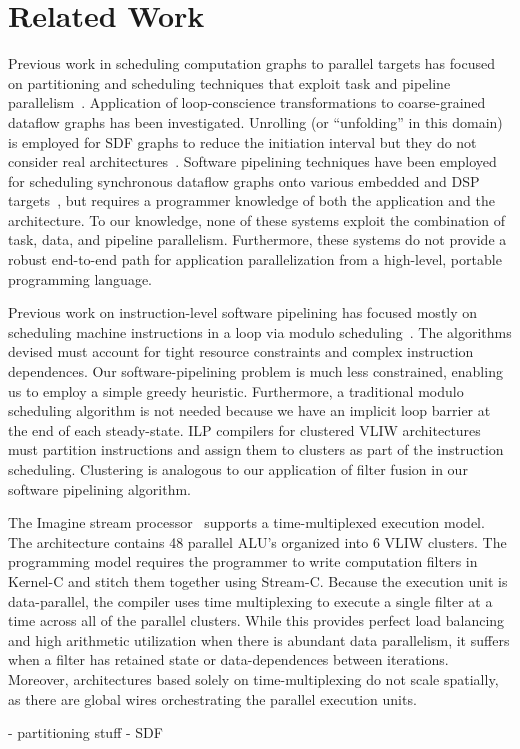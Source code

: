 \section{Related Work}
\label{sec:related}

Previous work in scheduling computation graphs to parallel targets has
focused on partitioning and scheduling techniques that exploit task
and pipeline parallelism~\cite{SDFSched, SDFSched2,
may87communicating, DAGSched, pipeline-sdf}.  Application of
loop-conscience transformations to coarse-grained dataflow graphs has
been investigated.  Unrolling (or ``unfolding'' in this domain) is
employed for SDF graphs to reduce the initiation interval but they do
not consider real architectures~\cite{unfolding,unfolding2}. Software
pipelining techniques have been employed for scheduling synchronous
dataflow graphs onto various embedded and DSP
targets~\cite{bakshi99,chatha-02}, but requires a programmer knowledge
of both the application and the architecture. To our knowledge, none
of these systems exploit the combination of task, data, and pipeline
parallelism.  Furthermore, these systems do not provide a robust
end-to-end path for application parallelization from a high-level,
portable programming language.

Previous work on instruction-level software pipelining has focused
mostly on scheduling machine instructions in a loop via modulo
scheduling~\cite{rau81, lam-softpipe}.  The algorithms devised must
account for tight resource constraints and complex instruction
dependences. Our software-pipelining problem is much less constrained,
enabling us to employ a simple greedy heuristic.  Furthermore, a
traditional modulo scheduling algorithm is not needed because we have
an implicit loop barrier at the end of each steady-state.  ILP
compilers for clustered VLIW architectures~\cite{Bulldog, Multiflow,
lee98spacetime, qian02} must partition instructions and assign them to
clusters as part of the instruction scheduling. Clustering is
analogous to our application of filter fusion in our software
pipelining algorithm. 




The Imagine stream processor~\cite{rixner98bandwidthefficient}
supports a time-multiplexed execution model.  The architecture
contains 48 parallel ALU's organized into 6 VLIW clusters.  The
programming model requires the programmer to write computation filters
in Kernel-C and stitch them together using Stream-C.  Because the
execution unit is data-parallel, the compiler uses time multiplexing
to execute a single filter at a time across all of the parallel
clusters.  While this provides perfect load balancing and high
arithmetic utilization when there is abundant data parallelism, it
suffers when a filter has retained state or data-dependences between
iterations.  Moreover, architectures based solely on time-multiplexing
do not scale spatially, as there are global wires orchestrating the
parallel execution units.

- partitioning stuff
- SDF
